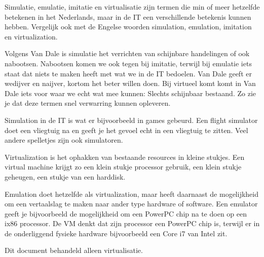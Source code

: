 Simulatie, emulatie, imitatie en virtualisatie zijn termen die min of meer hetzelfde betekenen in het Nederlands, maar in de IT een verschillende betekenis kunnen hebben. Vergelijk ook met de Engelse woorden simulation, emulation, imitation en virtualization.

Volgens Van Dale is simulatie het verrichten van schijnbare handelingen of ook nabootsen. Nabootsen komen we ook tegen bij imitatie, terwijl bij emulatie iets staat dat niets te maken heeft met wat we in de IT bedoelen. Van Dale geeft er wedijver en naijver, kortom het beter willen doen. Bij virtueel komt komt in Van Dale iets voor waar we echt wat mee kunnen: Slechts schijnbaar bestaand. Zo zie je dat deze termen snel verwarring kunnen opleveren.

Simulation in de IT is wat er bijvoorbeeld in games gebeurd. Een flight simulator doet een vliegtuig na en geeft je het gevoel echt in een vliegtuig te zitten. Veel andere spelletjes zijn ook simulatoren.

Virtualization is het ophakken van bestaande resources in kleine stukjes. Een virtual machine krijgt zo een klein stukje processor gebruik, een klein stukje geheugen, een stukje van een harddisk. 

Emulation doet hetzelfde als virtualization, maar heeft daarnaast de mogelijkheid om een vertaalslag te maken naar ander type hardware of software. Een emulator geeft je bijvoorbeeld de mogelijkheid om een PowerPC chip na te doen op een ix86 processor. De VM denkt dat zijn processor een PowerPC chip is, terwijl er in de onderliggend fysieke hardware bijvoorbeeld een Core i7 van Intel zit.

Dit document behandeld alleen virtualisatie.
